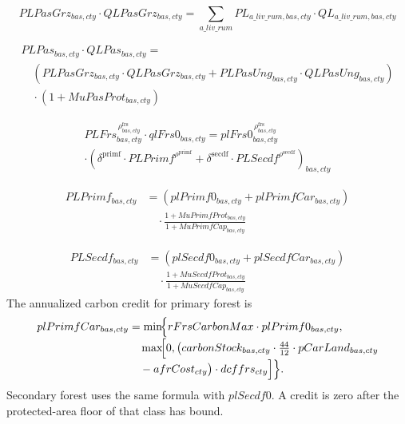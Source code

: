 \vspace{0.3\baselineskip}

\begin{equation}
  PLPasGrz_{bas,cty}\cdot QLPasGrz_{bas,cty}
  = \sum_{a\_liv\_rum} PL_{a\_liv\_rum,bas,cty}\cdot QL_{a\_liv\_rum,bas,cty}
  \tag{PLPasGrzEq}\label{eq:PLPasGrzEq}
\end{equation}

\vspace{0.3\baselineskip}

\begin{multline}
  PLPas_{bas,cty}\cdot QLPas_{bas,cty}
  =
  \\[-0.3em]
  \quad 
  \left(
    PLPasGrz_{bas,cty}\cdot QLPasGrz_{bas,cty}
    +
    PLPasUng_{bas,cty}\cdot QLPasUng_{bas,cty}
  \right)
  \\[-0.3em]
  \quad \cdot (1 + MuPasProt_{bas,cty})
  \tag{PLPasEq}\label{eq:PLPasEq}
\end{multline}

\vspace{0.3\baselineskip}

\begin{multline}
  PLFrs_{bas,cty}^{\,\rho^{\text{frs}}_{bas,cty}}
  \cdot qlFrs0_{bas,cty}
  = plFrs0_{bas,cty}^{\,\rho^{\text{frs}}_{bas,cty}}
  \\
  \cdot \left(
    \delta^{\text{primf}} \cdot PLPrimf^{\rho^{\text{primf}}}
    + \delta^{\text{secdf}} \cdot PLSecdf^{\rho^{\text{secdf}}}
  \right)_{bas,cty}
  \tag{PLFrsEq}\label{eq:PLFrsEq}
\end{multline}

\begin{align}
  PLPrimf_{bas,cty}
  &= (plPrimf0_{bas,cty}+plPrimfCar_{bas,cty})\nonumber\\[-0.3em]
  &\quad\cdot \frac{1+MuPrimfProt_{bas,cty}}{1+MuPrimfCap_{bas,cty}}
  \tag{PLPrimfEq}\label{eq:PLPrimfEq}
\end{align}

\begin{align}
  PLSecdf_{bas,cty}
  &= (plSecdf0_{bas,cty}+plSecdfCar_{bas,cty})\nonumber\\[-0.3em]
  &\quad\cdot \frac{1+MuSecdfProt_{bas,cty}}{1+MuSecdfCap_{bas,cty}}
  \tag{PLSecdfEq}\label{eq:PLSecdfEq}
\end{align}
The annualized carbon credit for primary forest is
\begin{align*}
  plPrimfCar_{bas,cty}
  &=\min\!\Bigl\{rFrsCarbonMax\cdot plPrimf0_{bas,cty},
  \nonumber\\[-0.3em]
  &\quad\max\!\Bigl[0,\bigl(carbonStock_{bas,cty}\cdot\tfrac{44}{12}
  \cdot pCarLand_{bas,cty}
  \nonumber\\[-0.3em]
  &\quad-afrCost_{cty}\bigr)\cdot dcffrs_{cty}\Bigr]\Bigr\}.
\end{align*}
Secondary forest uses the same formula with \(plSecdf0\). A credit is zero after the protected-area floor of that class has bound.

